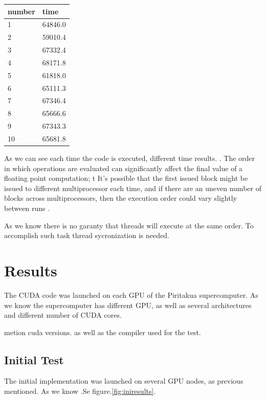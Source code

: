 \begin{table}[h]
\centering
  \begin{tabular} { |  l  |  l  |  }
    \hline
    number & time  \\
    \hline
    1 &  64846.0 \\
   \hline
    2 & 59010.4 \\
   \hline
    3 & 67332.4\\
   \hline
    4 & 68171.8 \\
   \hline
    5 & 61818.0 \\
   \hline
    6 & 65111.3\\
    \hline
    7 &  67346.4\\
    \hline
    8 & 65666.6 \\
    \hline
    9 & 67343.3 \\
    \hline
    10 & 65681.8      \\
   \hline
  \end{tabular}
  \end{table}
  
As we can see each time the code is executed, different time results.  . The order in which operations are evaluated can significantly affect the final value of a floating point computation; t
It's possible that the first issued block might be issued to different multiprocessor each time, and if there are an uneven number of blocks across multiprocessors, then the execution order could vary slightly between runs \cite{cook}.

As we know there is no garanty that threads will execute at the same order. To accomplish such task thread sycronization is needed.



\section{Results}

The CUDA code was launched on each GPU of the Piritakua supercomputer. As we know the supercomputer has different GPU, as well as several architectures and different number of CUDA cores.


metion cuda versions. as well as the compiler used for the test.


\subsection{Initial Test}

The initial implementation was launched on several GPU nodes, as previous mentioned.  As we know .Se figure.\ref{fig:iniresults}.

